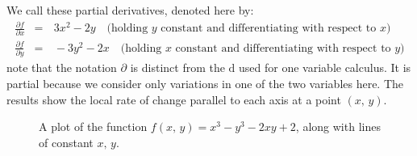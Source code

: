 \documentclass[letterpaper,10pt,english]{jupyterBook}
\begin{document}
\sphinxAtStartPar
We call these partial derivatives, denoted here by:
\begin{equation*}
\begin{split}\frac{\partial f}{\partial x} &=&\,  3x^2 - 2y \quad \textrm{(holding $y$ constant and differentiating with respect to $x$)}\\
\frac{\partial f}{\partial y} &=&\, -3y^2 - 2x \quad \textrm{(holding $x$ constant and differentiating with respect to $y$)}\end{split}
\end{equation*}
\sphinxAtStartPar
note that the notation \(\partial\) is distinct from the \(\mathrm{d}\) used for one variable calculus.  It is partial because we
consider only variations in one of the two variables here.  The results show the local rate of change parallel to each axis at a point \((x,\,y)\).

\begin{figure}[htbp]
\centering
\capstart

\noindent{}
\caption{A plot of the function \(f(x,\, y) = x^3 - y^3 - 2xy + 2\), along with lines of constant \(x,\,y\).}\label{\detokenize{VectorCalculus/partialdifferentiation:surf1}}\end{figure}
\end{document}

